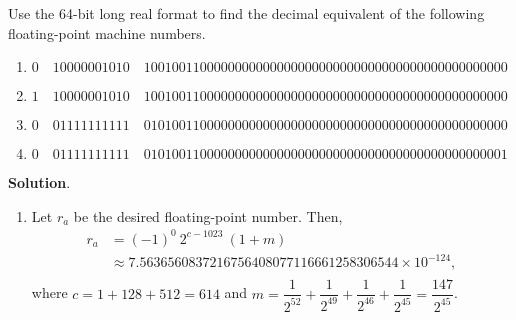 \documentclass[11pt]{article}
\theoremstyle{break}
\numberwithin{equation}{theorem}
\begin{document}
\newpage
\begin{problem}\label{problem 7}
    Use the 64-bit long real format to find the decimal equivalent of the following floating-point machine numbers.
    \begin{enumerate}
        \item $0\quad 10000001010\quad 1001001100000000000000000000000000000000000000000000$
        \item $1\quad 10000001010\quad 1001001100000000000000000000000000000000000000000000$
        \item $0\quad 01111111111\quad 0101001100000000000000000000000000000000000000000000$
        \item $0\quad 01111111111\quad 0101001100000000000000000000000000000000000000000001$
    \end{enumerate}
\end{problem}
\textbf{Solution}.
\begin{enumerate}
    \item Let $r_a$ be the desired floating-point number. Then, \vspace{-0.6em}
    \begin{align*}
        r_a&=(-1)^0\:2^{c-1023}\:(1+m)\\
        &\approx7.5636560837216756408077116661258306544\times10^{-124},\\[-3.4em]
    \end{align*}
    where $c=1+128+512=614$ and $m=\dfrac{1}{2^{52}}+\dfrac{1}{2^{49}}+\dfrac{1}{2^{46}}+\dfrac{1}{2^{45}}=\dfrac{147}{2^{45}}$.
\end{enumerate}
\end{document}

